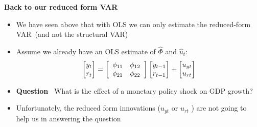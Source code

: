 \documentclass[10pt,english,t,aspectratio=169,ignorenonframetext]{beamer}
\begin{document}
\begin{frame}
{\textbf{Back to our reduced form VAR}} \bigskip

\begin{itemize}
\item We have seen above that with OLS we can only estimate the reduced-form
VAR\ (and not the structural VAR) \bigskip

\item Assume we already have an OLS estimate of $\hat{\Phi}$ and $\hat{u}%
_{t} $:%
\begin{equation*}
\begin{bmatrix}
y_{t} \\ 
r_{t}%
\end{bmatrix}%
=\left[ 
\begin{array}{cc}
\phi _{11} & \phi _{12} \\ 
\phi _{21} & \phi _{22}%
\end{array}%
\right] 
\begin{bmatrix}
y_{t-1} \\ 
r_{t-1}%
\end{bmatrix}%
+%
\begin{bmatrix}
u_{yt}\\ 
u_{rt}%
\end{bmatrix}%
\medskip
\end{equation*}%
\pause

\item \textbf{Question} \ What is the effect of a monetary policy shock on
GDP growth?\bigskip\pause

\item Unfortunately, the reduced form innovations ($u_{yt}$ or $u_{rt}$%
) are not going to help us in answering the question
\end{itemize}
\end{frame}

\end{document}
